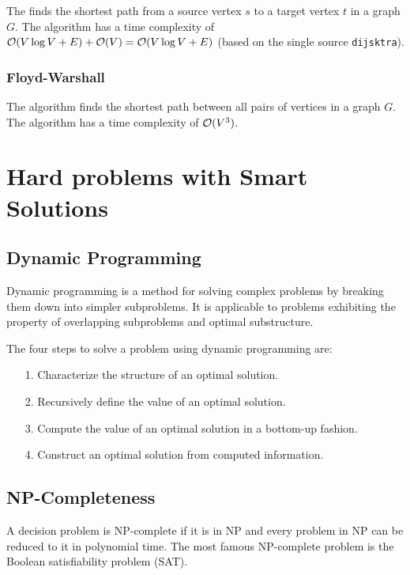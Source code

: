 \documentclass{article}
\begin{document}
The  finds the shortest path from a source vertex $s$ to a target vertex $t$ in a graph $G$. The algorithm has a time complexity of $\mathcal{O}(V\log V+E)+\mathcal{O}(V)=\mathcal{O}(V\log V+E)$ (based on the single source \texttt{dijsktra}).\par


\subsubsection{Floyd-Warshall}
The  algorithm finds the shortest path between all pairs of vertices in a graph $G$. The algorithm has a time complexity of $\mathcal{O}(V^3)$.\par




\section{Hard problems with Smart Solutions}
\subsection{Dynamic Programming}
Dynamic programming is a method for solving complex problems by breaking them down into simpler subproblems. It is applicable to problems exhibiting the property of overlapping subproblems and optimal substructure.

The four steps to solve a problem using dynamic programming are:
\begin{enumerate}
  \item[1.] Characterize the structure of an optimal solution.
  \item[2.] Recursively define the value of an optimal solution.
  \item[3.] Compute the value of an optimal solution in a bottom-up fashion.
  \item[4.] Construct an optimal solution from computed information.
\end{enumerate}

\subsection{NP-Completeness}
A decision problem is NP-complete if it is in NP and every problem in NP can be reduced to it in polynomial time. The most famous NP-complete problem is the Boolean satisfiability problem (SAT).
\end{document}
